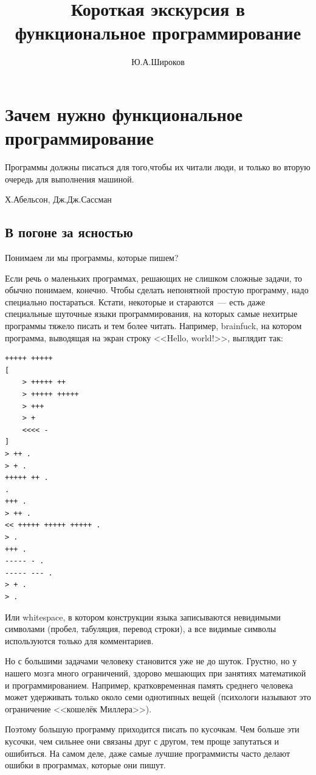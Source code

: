 \documentclass[
  paper=a4,
  fontsize=14pt,
  openany,
  appendixprefix=true
]{scrbook}
\author{Ю.А.Широков}
\title{Короткая экскурсия в функциональное программирование}
\begin{document}
\maketitle

\tableofcontents

\chapter{Зачем нужно функциональное программирование}

\epigraph{Программы должны писаться для того,чтобы их читали люди, и только во вторую очередь для выполнения машиной.}{Х.Абельсон, Дж.Дж.Сассман}

\section{В погоне за ясностью}

Понимаем ли мы программы, которые пишем?

Если речь о маленьких программах, решающих не слишком сложные задачи, то обычно понимаем, конечно. Чтобы сделать непонятной простую программу, надо специально постараться. Кстати, некоторые и стараются~--- есть даже специальные шуточные языки программирования, на которых самые нехитрые программы тяжело писать и тем более читать. Например, brainfuck, на котором программа, выводящая на экран строку <<Hello, world!>>, выглядит так:
\begin{verbatim}
+++++ +++++
[
    > +++++ ++
    > +++++ +++++
    > +++
    > +
    <<<< -
]
> ++ .
> + .
+++++ ++ .
.
+++ .
> ++ .
<< +++++ +++++ +++++ .
> .
+++ .
----- - .
----- --- .
> + .
> .
\end{verbatim}

Или whitespace, в котором конструкции языка записываются невидимыми символами (пробел, табуляция, перевод строки), а все видимые символы используются только для комментариев.

Но с большими задачами человеку становится уже не до шуток. Грустно, но у нашего мозга много ограничений, здорово мешающих при занятиях математикой и программированием. Например, кратковременная память среднего человека может удерживать только около семи однотипных вещей (психологи называют это ограничение <<кошелёк Миллера>>).

Поэтому большую программу приходится писать по кусочкам. Чем больше эти кусочки, чем сильнее они связаны друг с другом, тем проще запутаться и ошибиться. На самом деле, даже самые лучшие программисты часто делают ошибки в программах, которые они пишут.
\end{document}
